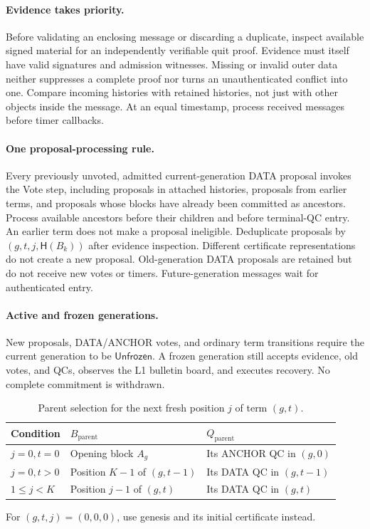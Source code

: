 \documentclass[11pt,a4paper]{article}
\newcommand{\Hash}{\mathsf H}
\newcommand{\tagg}[1]{\ensuremath{\mathsf{#1}}}
\begin{document}
\paragraph{Evidence takes priority.}
Before validating an enclosing message or discarding a duplicate, inspect
available signed material for an independently verifiable quit proof.
Evidence must itself have valid signatures and admission witnesses.
Missing or invalid outer data neither suppresses a complete proof nor
turns an unauthenticated conflict into one. Compare incoming histories
with retained histories, not just with other objects inside the message.
At an equal timestamp, process received messages before timer callbacks.

\paragraph{One proposal-processing rule.}
Every previously unvoted, admitted current-generation DATA proposal invokes
the Vote step, including proposals in attached histories, proposals from
earlier terms, and proposals whose blocks have already been committed as
ancestors. Process available ancestors before their children and before
terminal-QC entry. An earlier term does not make a proposal ineligible.
Deduplicate proposals by $(g,t,j,\Hash(B_k))$ after evidence inspection.
Different certificate representations do not create a new proposal.
Old-generation DATA proposals are retained but do not receive new votes
or timers. Future-generation messages wait for authenticated entry.

\paragraph{Active and frozen generations.}
New proposals, DATA/ANCHOR votes, and ordinary term transitions require
the current generation to be \tagg{Unfrozen}. A frozen generation still
accepts evidence, old votes, and QCs, observes the L1 bulletin board, and
executes recovery. No complete commitment is withdrawn.

\begin{table}[htbp]\centering\small
\caption{Parent selection for the next fresh position $j$ of term $(g,t)$.}
\label{tab:parent}
\begin{tabularx}{\linewidth}{@{}l Y Y@{}}
\toprule
Condition & $B_{\mathrm{parent}}$ & $Q_{\mathrm{parent}}$\\
\midrule
$j=0,t=0$ & Opening block $A_g$ & Its ANCHOR QC in $(g,0)$\\
$j=0,t>0$ & Position $K-1$ of $(g,t-1)$ & Its DATA QC in $(g,t-1)$\\
$1\le j<K$ & Position $j-1$ of $(g,t)$ & Its DATA QC in $(g,t)$\\
\bottomrule
\end{tabularx}
\smallskip
For $(g,t,j)=(0,0,0)$, use genesis and its initial certificate instead.
\end{table}
\end{document}
